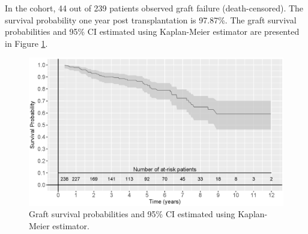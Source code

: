 In the cohort, 44 out of 239 patients observed graft failure (death-censored). The survival probability one year post transplantation is 97.87\%. The graft survival probabilities and 95\% CI estimated using Kaplan-Meier estimator are presented in Figure \ref{fig : km_curve}. 

\begin{figure}[!htb]
\centerline{\includegraphics[width=\columnwidth]{images/km.eps}}
\caption{Graft survival probabilities and 95\% CI estimated using Kaplan-Meier estimator.}
\label{fig : km_curve}
\end{figure}

